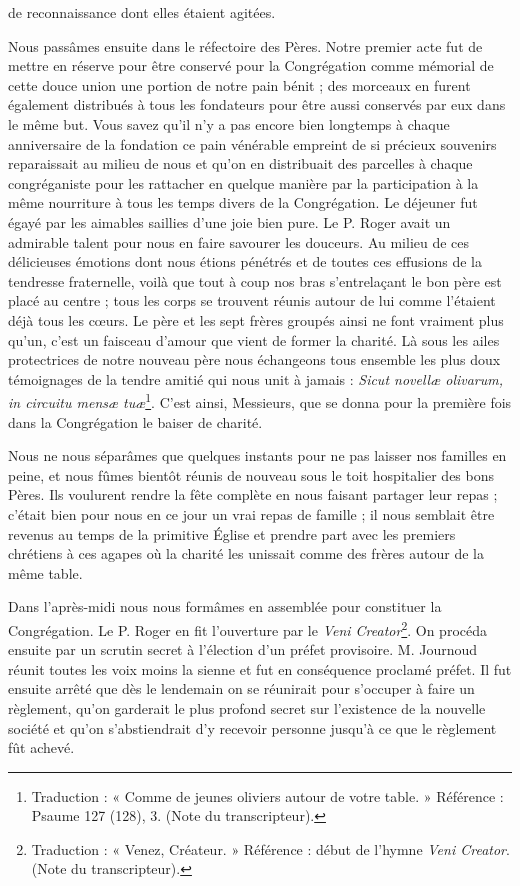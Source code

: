 de reconnaissance dont elles étaient agitées.

Nous passâmes ensuite dans le réfectoire des Pères. Notre premier acte fut de mettre en réserve pour être conservé pour la Congrégation comme mémorial de cette douce union une portion de notre pain bénit ; des morceaux en furent également distribués à tous les fondateurs pour être aussi conservés par eux dans le même but. Vous savez qu'il n'y a pas encore bien longtemps à chaque anniversaire de la fondation ce pain vénérable empreint de si précieux souvenirs reparaissait au milieu de nous et qu'on en distribuait des parcelles à chaque congréganiste pour les rattacher en quelque manière par la participation à la même nourriture à tous les temps divers de la Congrégation. Le déjeuner fut égayé par les aimables saillies d'une joie bien pure. Le P. Roger avait un admirable talent pour nous en faire savourer les douceurs. Au milieu de ces délicieuses émotions dont nous étions pénétrés et de toutes ces effusions de la tendresse fraternelle, voilà que tout à coup nos bras s'entrelaçant le bon père est placé au centre ; tous les corps se trouvent réunis autour de lui comme l'étaient déjà tous les cœurs. Le père et les sept frères groupés ainsi ne font vraiment plus qu'un, c'est un faisceau d'amour que vient de former la charité. Là sous les ailes protectrices de notre nouveau père nous échangeons tous ensemble les plus doux témoignages de la tendre amitié qui nous unit à jamais : \textit{Sicut novellæ olivarum, in circuitu mensæ tuæ}\footnote{Traduction : « Comme de jeunes oliviers autour de votre table. » Référence : Psaume 127 (128), 3. (Note du transcripteur).}. C'est ainsi, Messieurs, que se donna pour la première fois dans la Congrégation le baiser de charité.

Nous ne nous séparâmes que quelques instants pour ne pas laisser nos familles en peine, et nous fûmes bientôt réunis de nouveau sous le toit hospitalier des bons Pères. Ils voulurent rendre la fête complète en nous faisant partager leur repas ; c'était bien pour nous en ce jour un vrai repas de famille ; il nous semblait être revenus au temps de la primitive Église et prendre part avec les premiers chrétiens à ces agapes où la charité les unissait comme des frères autour de la même table.

Dans l'après-midi nous nous formâmes en assemblée pour constituer la Congrégation. Le P. Roger en fit l'ouverture par le \textit{Veni Creator}\footnote{Traduction : « Venez, Créateur. » Référence : début de l’hymne \textit{Veni Creator}. (Note du transcripteur).}. On procéda ensuite par un scrutin secret à l'élection d'un préfet provisoire. M. Journoud réunit toutes les voix moins la sienne et fut en conséquence proclamé préfet. Il fut ensuite arrêté que dès le lendemain on se réunirait pour s'occuper à faire un règlement, qu'on garderait le plus profond secret sur l'existence de la nouvelle société et qu'on s'abstiendrait d'y recevoir personne jusqu'à ce que le règlement fût achevé.

